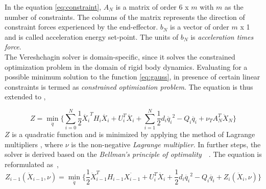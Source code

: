  In the equation \ref{eq:constraint}, $A_N$ is a matrix of order 6 x $m$ with $m$ as the number of constraints. The columns of the matrix represents the direction of constraint forces experienced by the end-effector. $b_N$ is a vector of order $m$ x 1 and is called acceleration energy set-point. The units of $b_N$ is \textit{acceleration times force}.\\
 
% 


The Vereshchagin solver is domain-specific, since it solves the constrained optimization problem in the domain of rigid body dynamics. Evaluating for a possible minimum solution to the function \ref{eq:gauss}, in presence of certain linear constraints is termed as \textit{constrained optimization problem}. The equation is thus extended to \cite{shakhimardanov2015composable}, 

 \begin{equation} \label{eq:minimization}
 Z = \min_{\ddot{q}} \Big \{\sum_{i=0}^{N} \frac{1}{2} \ddot{X_i}^T H_i \ddot{X_i} + U_i^T\ddot{X_i} + \sum_{i=1}^{N} \frac{1}{2} d_i \ddot{q_i}^2 - Q_i \ddot{q_i} + \nu_T A^T_N \ddot{X}_N \Big \}
 \end{equation} 
$Z$ is a quadratic function and is minimized by applying the method of Lagrange multipliers \cite{bertsekas2014constrained}, where $\nu$ is the non-negative \textit{Lagrange multiplier}. In further steps, the solver is derived based on the \textit{Bellman's principle of optimality}~\cite{bertsekas1996dynamic}~\cite{bellman2013dynamic}. The equation is reformulated  as~\cite{shakhimardanov2015composable},
 \begin{equation} \label{eq:bellman}
 Z_{i-1}(\ddot{X}_{i-1}, \nu) = \min_{\ddot{q}} \Big \{ \frac{1}{2} \ddot{X}_{i-1}^T H_{i-1} \ddot{X_{i-1}} + U_i^T\ddot{X_i} + \frac{1}{2} d_i \ddot{q_i}^2 - Q_i \ddot{q_i} + Z_i(\ddot{X}_i, \nu)\Big \}
 \end{equation} 
 
